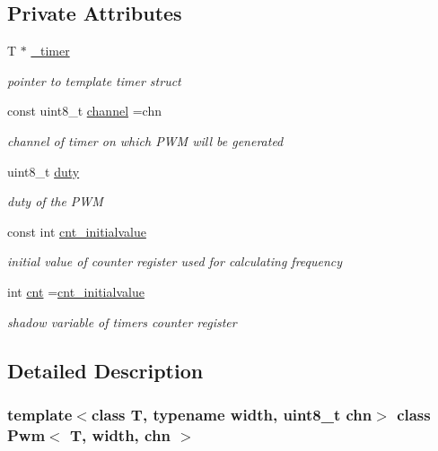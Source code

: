 \subsection*{Private Attributes}
\begin{DoxyCompactItemize}
\item 
T $\ast$ \mbox{\hyperlink{class_pwm_a2aa2d31eb683e2100620809fa253a25a}{\+\_\+timer}}
\begin{DoxyCompactList}\small\item\em pointer to template timer struct \end{DoxyCompactList}\item 
const uint8\+\_\+t \mbox{\hyperlink{class_pwm_af854993c7cdd5069144ec812e976ecec}{channel}} =chn
\begin{DoxyCompactList}\small\item\em channel of timer on which P\+WM will be generated \end{DoxyCompactList}\item 
uint8\+\_\+t \mbox{\hyperlink{class_pwm_af344531820202020c97a8421ed5d5e2a}{duty}}
\begin{DoxyCompactList}\small\item\em duty of the P\+WM \end{DoxyCompactList}\item 
const int \mbox{\hyperlink{class_pwm_a427493526d0462d93d2724109c1be87d}{cnt\+\_\+initialvalue}}
\begin{DoxyCompactList}\small\item\em initial value of counter register used for calculating frequency \end{DoxyCompactList}\item 
int \mbox{\hyperlink{class_pwm_aff1e9a509192f990362149d140c088c5}{cnt}} =\mbox{\hyperlink{class_pwm_a427493526d0462d93d2724109c1be87d}{cnt\+\_\+initialvalue}}
\begin{DoxyCompactList}\small\item\em shadow variable of timers counter register \end{DoxyCompactList}\end{DoxyCompactItemize}


\subsection{Detailed Description}
\subsubsection*{template$<$class T, typename width, uint8\+\_\+t chn$>$\newline
class Pwm$<$ T, width, chn $>$}


